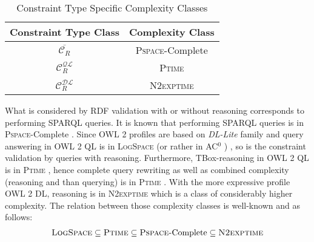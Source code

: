 \documentclass{llncs}
\begin{document}
\begin{table}
\centering

\begin{tabular}{c | c}

\textbf{Constraint Type Class}  & \textbf{Complexity Class}\\
\hline
$\overline{\mathcal{C}_R}$ & \textsc{Pspace}-Complete \\
\hline
$\mathcal{C}_R ^{\mathcal{QL}}$ & \textsc{Ptime} \\
\hline
$\mathcal{C}_R ^{\mathcal{DL}}$ & \textsc{N2exptime} \\

\end{tabular}
\caption{Constraint Type Specific Complexity Classes}
\label{tab:constraint-type-specific-complexity-classes}
\end{table}


What is considered by RDF validation with or without reasoning corresponds to performing SPARQL queries.  
It is known that performing SPARQL queries is in \textsc{Pspace}-Complete \cite{Perez2009}. Since OWL 2 profiles are based on \textit{DL-Lite} family and query answering in OWL 2 QL is in \textsc{LogSpace} (or rather in AC$^0$ ) \cite{Calvanese2007}, so is the constraint validation by queries with  reasoning. Furthermore, TBox-reasoning in OWL 2 QL is in \textsc{Ptime} \cite{Calvanese2007}, hence complete query rewriting as well as combined complexity (reasoning and than querying) is in \textsc{Ptime} \cite{Artale2009,Calvanese2007}.  With the more expressive profile OWL 2 DL, reasoning is in \textsc{N2exptime} \cite{owl2profiles2008} which is a class of considerably higher complexity.
The  relation between those complexity classes is well-known \cite{Arora:2009:CCM:1540612} and as follows:
\begin{eqnarray*}
\textsc{LogSpace} \subseteq \textsc{Ptime} \subseteq \textsc{Pspace-}\text{Complete} \subseteq \textsc{N2exptime} 
\end{eqnarray*}
\end{document}
